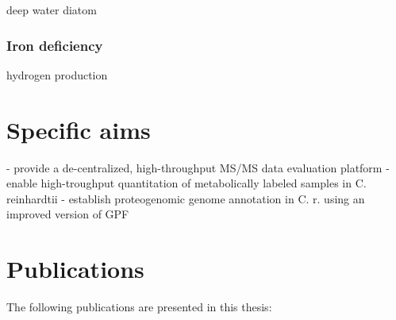 \documentclass[11pt,a4paper,twoside]{report}
\begin{document}
\begin{todo}
deep water diatom
\end{todo}

\subsection{Iron deficiency}

\begin{todo}
hydrogen production
\end{todo}

\chapter{Specific aims}

\begin{todo}
- provide a de-centralized, high-throughput MS/MS data evaluation platform
- enable high-troughput quantitation of metabolically labeled samples in C. reinhardtii
- establish proteogenomic genome annotation in C. r. using an improved version of GPF
\end{todo}

\chapter{Publications}

The following publications are presented in this thesis:
\end{document}
